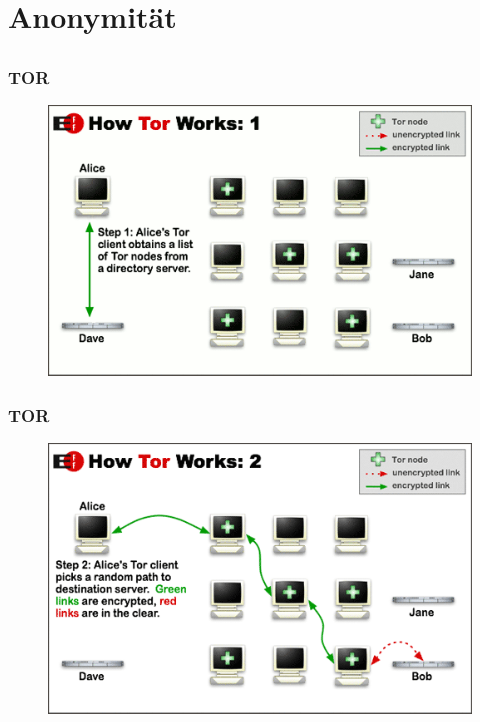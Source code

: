 \documentclass[12pt]{beamer}
\begin{document}
\subsection{}

\section{Anonymität}
\subsection{}

\begin{frame}
  \frametitle{TOR}
  \begin{figure}
    \includegraphics[height=0.7\textheight]{img/tor-1.png}
  \end{figure}
\end{frame}

\begin{frame}
  \frametitle{TOR}
  \begin{figure}
    \includegraphics[height=0.7\textheight]{img/tor-2.png}
  \end{figure}
\end{frame}
\end{document}
